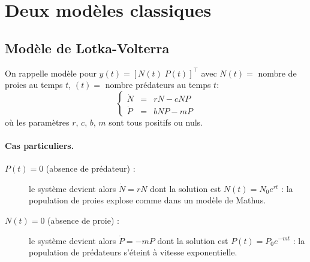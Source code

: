 \section{Deux modèles classiques}


\subsection{Modèle de Lotka-Volterra}

On rappelle modèle pour $y(t) = [N(t) \; P(t)]^\top$ avec $N(t) =$ nombre de proies au temps $t$, $(t) = $ nombre prédateurs au temps $t$:
$$
\left\{ \begin{array}{rcl} 
  \dot N & = & r N - c N P \\
  \dot P & = & b N P  - m P
\end{array} \right.
$$
où les paramètres $r$, $c$, $b$, $m$ sont tous positifs ou nuls.

\paragraph*{Cas particuliers.}
\begin{description}
  \item[$P(t) = 0 $ (absence de prédateur) :] le système devient alors $\dot N = r N$ dont la solution est $N(t) = N_0 e^{rt}$ : la population de proies explose comme dans un modèle de Mathus.
  \item[$N(t) = 0 $ (absence de proie) :] le système devient alors $\dot P = - m P$ dont la solution est $P(t) = P_0 e^{-mt}$ : la population de prédateurs s'éteint à vitesse exponentielle.
\end{description}


